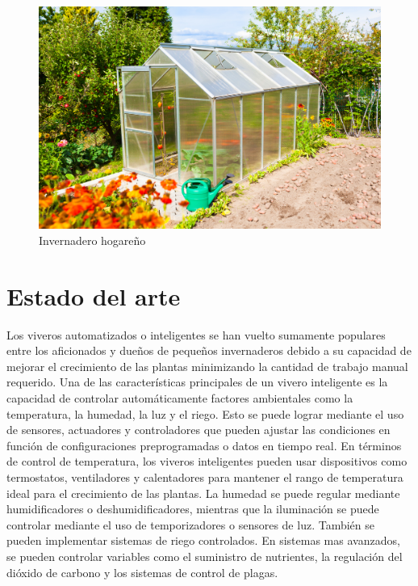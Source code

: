 \begin{figure}[htpb]
\centering 
\includegraphics[width=.7\textwidth]{../Figures/invernadero1.jpg}
\caption{Invernadero hogareño}
\label{fig:imgInvernadero}
\end{figure}



\section{Estado del arte}
\label{sec:Estado del arte}

Los viveros automatizados o inteligentes se han vuelto sumamente populares entre los aficionados y dueños de pequeños invernaderos debido a su capacidad de mejorar el crecimiento de las plantas minimizando la cantidad de trabajo manual requerido. Una de las características principales de un vivero inteligente es la capacidad de controlar automáticamente factores ambientales como la temperatura, la humedad, la luz y el riego. Esto se puede lograr mediante el uso de sensores, actuadores y controladores que pueden ajustar las condiciones en función de configuraciones preprogramadas o datos en tiempo real. 
En términos de control de temperatura, los viveros inteligentes pueden usar dispositivos como termostatos, ventiladores y calentadores para mantener el rango de temperatura ideal para el crecimiento de las plantas. La humedad se puede regular mediante humidificadores o deshumidificadores, mientras que la iluminación se puede controlar mediante el uso de temporizadores o sensores de luz. También se pueden implementar sistemas de riego controlados. En sistemas mas avanzados, se pueden controlar variables como el suministro de nutrientes, la regulación del dióxido de carbono y los sistemas de control de plagas. 




